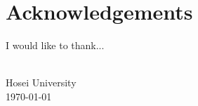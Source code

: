 \chapter*{Acknowledgements}
\addchaptertocentry{\acknowledgementname} %


\noindent I would like to thank...
\\[0.4cm]

\begin{flushright}
    \authorname \\
    Hosei University \\
    \usdate\today
\end{flushright}


